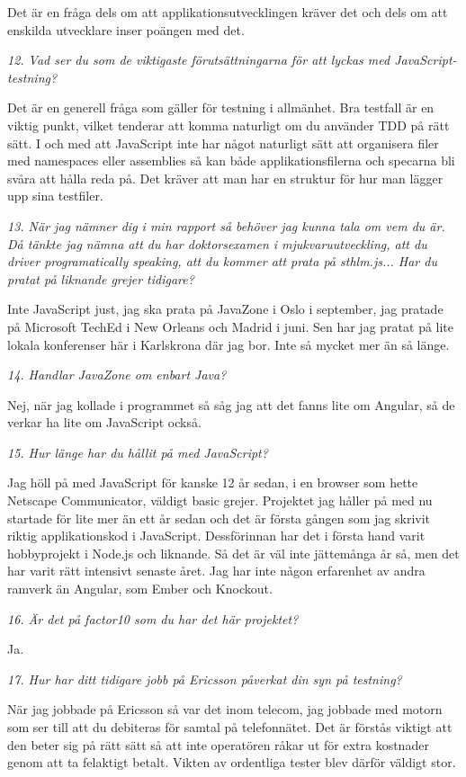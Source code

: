 \documentclass[11pt]{article}
\begin{document}
Det är en fråga dels om att applikationsutvecklingen kräver det och dels om att enskilda utvecklare inser poängen med det.

\emph{12. Vad ser du som de viktigaste förutsättningarna för att lyckas med JavaScript-testning?}

Det är en generell fråga som gäller för testning i allmänhet. Bra testfall är en viktig punkt, vilket tenderar att komma naturligt om du använder TDD på rätt sätt. I och med att JavaScript inte har något naturligt sätt att organisera filer med namespaces eller assemblies så kan både applikationsfilerna och specarna bli svåra att hålla reda på. Det kräver att man har en struktur för hur man lägger upp sina testfiler.

\emph{13. När jag nämner dig i min rapport så behöver jag kunna tala om vem du är. Då tänkte jag nämna att du har doktorsexamen i mjukvaruutveckling, att du driver programatically speaking, att du kommer att prata på sthlm.js... Har du pratat på liknande grejer tidigare?}

Inte JavaScript just, jag ska prata på JavaZone i Oslo i september, jag pratade på Microsoft TechEd i New Orleans och Madrid i juni. Sen har jag pratat på lite lokala konferenser här i Karlskrona där jag bor. Inte så mycket mer än så länge.

\emph{14. Handlar JavaZone om enbart Java?}

Nej, när jag kollade i programmet så såg jag att det fanns lite om Angular, så de verkar ha lite om JavaScript också.

\emph{15. Hur länge har du hållit på med JavaScript?}

Jag höll på med JavaScript för kanske 12 år sedan, i en browser som hette Netscape Communicator, väldigt basic grejer. Projektet jag håller på med nu startade för lite mer än ett år sedan och det är första gången som jag skrivit riktig applikationskod i JavaScript. Dessförinnan har det i första hand varit hobbyprojekt i Node.js och liknande. Så det är väl inte jättemånga år så, men det har varit rätt intensivt senaste året. Jag har inte någon erfarenhet av andra ramverk än Angular, som Ember och Knockout.

\emph{16. Är det på factor10 som du har det här projektet?}

Ja.

\emph{17. Hur har ditt tidigare jobb på Ericsson påverkat din syn på testning?}

När jag jobbade på Ericsson så var det inom telecom, jag jobbade med motorn som ser till att du debiteras för samtal på telefonnätet. Det är förstås viktigt att den beter sig på rätt sätt så att inte operatören råkar ut för extra kostnader genom att ta felaktigt betalt. Vikten av ordentliga tester blev därför väldigt stor.
\end{document}
